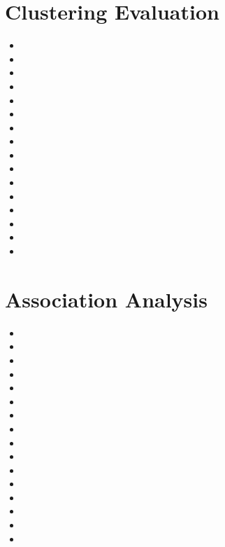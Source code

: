 \documentclass[12pt, a4paper,titlepage,openany]{article}
\begin{document}
\section{Clustering Evaluation}
\begin{itemize}
	\item 
	\item
	\item
	\item
	\item 
	\item
	\item
	\item
	\item 
	\item
	\item
	\item
	\item 
	\item
	\item
	\item
\end{itemize}
\section{Association Analysis}
\begin{itemize}
	\item 
	\item
	\item
	\item
	\item 
	\item
	\item
	\item
	\item 
	\item
	\item
	\item
	\item 
	\item
	\item
	\item
\end{itemize}
\end{document}
